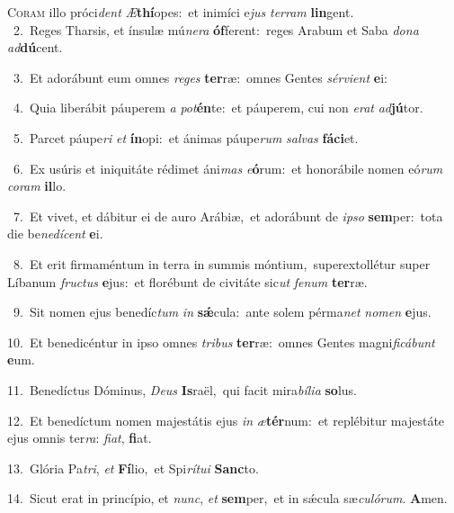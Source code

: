 \lettrine{\initial\textcolor{\initialcolor}{C}}{oram} illo próci\textit{dent} \textit{Æ}\-\textbf{thí}opes:~\star et inimíci e\textit{jus} \textit{ter}\-\textit{ram} \textbf{lin}\-gent.\\
{\numbfont\textcolor{\numbcolor}{~2.}}~Reges Tharsis, et ínsulæ mú\-\textit{ne}\-\textit{ra} \textbf{óf}\-ferent:~\star reges Arabum et Saba \textit{do}\-\textit{na} \textit{ad}\-\textbf{dú}cent.\par
{\numbfont\textcolor{\numbcolor}{~3.}}~Et adorábunt eum omnes \textit{re}\-\textit{ges} \textbf{ter}\-ræ:~\star omnes Gentes \textit{sér}\-\textit{vi}\textit{ent} \textbf{e}\-i:\par
{\numbfont\textcolor{\numbcolor}{~4.}}~Quia liberábit páuperem \textit{a} \textit{pot}\-\textbf{én}te:~\star et páuperem, cui non \textit{e}\-\textit{rat} \textit{ad}\-\textbf{jú}tor.\par
{\numbfont\textcolor{\numbcolor}{~5.}}~Parcet páupe\textit{ri} \textit{et} \textbf{ín}\-opi:~\star et ánimas páupe\textit{rum} \textit{sal}\-\textit{vas} \textbf{fá}\-\textbf{ci}et.\par
{\numbfont\textcolor{\numbcolor}{~6.}}~Ex usúris et iniquitáte rédimet áni\textit{mas} \textit{e}\-\textbf{ó}rum:~\star et honorábile nomen eó\textit{rum} \textit{co}\-\textit{ram} \textbf{il}\-lo.\par
{\numbfont\textcolor{\numbcolor}{~7.}}~Et vivet, et dábitur ei de auro Arábiæ,~\dagger et adorábunt de \textit{ip}\-\textit{so} \textbf{sem}\-per:~\star tota die be\-\textit{ne}\-\textit{dí}\textit{cent} \textbf{e}\-i.\par
{\numbfont\textcolor{\numbcolor}{~8.}}~Et erit firmaméntum in terra in summis móntium,~\dagger superextollétur super Líbanum \textit{fruc}\-\textit{tus} \textbf{e}\-jus:~\star et florébunt de civitáte sic\textit{ut} \textit{fe}\-\textit{num} \textbf{ter}\-ræ.\par
{\numbfont\textcolor{\numbcolor}{~9.}}~Sit nomen ejus benedíc\textit{tum} \textit{in} \textbf{sǽ}\-cula:~\star ante solem pérma\textit{net} \textit{no}\-\textit{men} \textbf{e}\-jus.\par
{\numbfont\textcolor{\numbcolor}{10.}}~Et benedicéntur in ipso omnes \textit{tri}\-\textit{bus} \textbf{ter}\-ræ:~\star omnes Gentes magni\-\textit{fi}\-\textit{cá}\textit{bunt} \textbf{e}\-um.\par
{\numbfont\textcolor{\numbcolor}{11.}}~Benedíctus Dóminus, \textit{De}\-\textit{us} \textbf{Is}\-raël,~\star qui facit mira\-\textit{bí}\-\textit{li}\textit{a} \textbf{so}\-lus.\par
{\numbfont\textcolor{\numbcolor}{12.}}~Et benedíctum nomen majestátis ejus \textit{in} \textit{æ}\-\textbf{tér}num:~\star et replébitur majestáte ejus omnis ter\-\textit{ra}\-: \textit{fi}\-\textit{at}, \textbf{fi}\-at.\par
{\numbfont\textcolor{\numbcolor}{13.}}~Glória Pa\-\textit{tri}\-, \textit{et} \textbf{Fí}\-lio,~\star et Spi\-\textit{rí}\-\textit{tu}\textit{i} \textbf{Sanc}\-to.\par
{\numbfont\textcolor{\numbcolor}{14.}}~Sicut erat in princípio, et \textit{nunc}\-, \textit{et} \textbf{sem}\-per,~\star et in sǽcula sæ\-\textit{cu}\-\textit{ló}\textit{rum}. \textbf{A}\-men.\par
